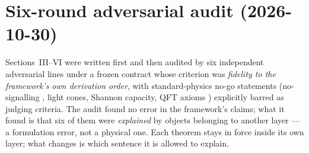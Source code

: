 \documentclass[aps,prd,preprint,superscriptaddress,amsmath,amssymb]{revtex4-2}
\begin{document}
\section{Six-round adversarial audit (2026-10-30)}
\label{sec:audit}

Sections~III--VI were written first and then audited by six independent
adversarial lines under a frozen contract whose criterion was
\emph{fidelity to the framework's own derivation order}, with standard-physics
no-go statements (no-signalling \cite{bell1964einstein,aspect1982experimental}, light cones, Shannon capacity, QFT axioms \cite{weinberg1995quantum,wald1994quantum})
explicitly barred as judging criteria.  The audit found no error in the
framework's claims; what it found is that six of them were \emph{explained} by
objects belonging to another layer --- a formulation error, not a physical one.
Each theorem stays in force inside its own layer; what changes is which sentence
it is allowed to explain.
\end{document}
